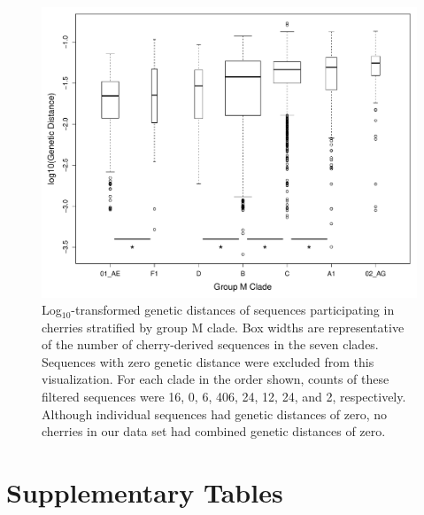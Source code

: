 \documentclass[12pt]{article}
\begin{document}
\begin{figure}[htbp]
    \centering
    \includegraphics[width=.95\textwidth, trim={3mm, 0mm, 0mm, 0mm}, clip]{boxplot_logGD.pdf}
    \caption{ Log$_{10}$-transformed genetic distances of sequences participating in cherries stratified by group M clade. 
    Box widths are representative of the number of cherry-derived sequences in the seven clades. 
    Sequences with zero genetic distance were excluded from this visualization. 
    For each clade in the order shown, counts of these filtered sequences were 16, 0, 6, 406, 24, 12, 24, and 2, respectively. 
    Although individual sequences had genetic distances of zero, no cherries in our data set had combined genetic distances of zero.}
    \label{boxplot_GD}
\end{figure}

\clearpage

\section * {Supplementary Tables}
\end{document}
